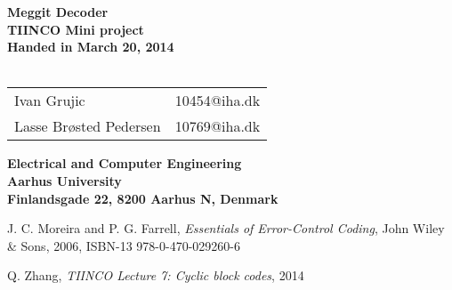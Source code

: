 \documentclass[a4paper,10pt]{report}
\begin{document}

\begin{titlepage}
\begin{center}
{\LARGE \textbf{Meggit Decoder}}\\
{\large \textbf{TIINCO Mini project}}\\

\vspace{4cm}
\textbf{Handed in March 20, 2014}\\~\\ 
\begin{tabular}{ll}
Ivan Grujic & 10454@iha.dk \\
Lasse Brøsted Pedersen & 10769@iha.dk \\
\end{tabular}
\vfill
\textbf{Electrical and Computer Engineering}\\
\textbf{Aarhus University}\\
\textbf{Finlandsgade 22, 8200 Aarhus N, Denmark}
\end{center}
\end{titlepage}

\setcounter{tocdepth}{1}
\tableofcontents

\listoffixmes









\begin{thebibliography}{9}

J. C. Moreira and P. G. Farrell, \emph{Essentials of Error-Control Coding}, John Wiley \& Sons, 2006,
ISBN-13 978-0-470-029260-6

Q. Zhang, \emph{TIINCO Lecture 7: Cyclic block codes}, 2014


\end{thebibliography}
\end{document}
